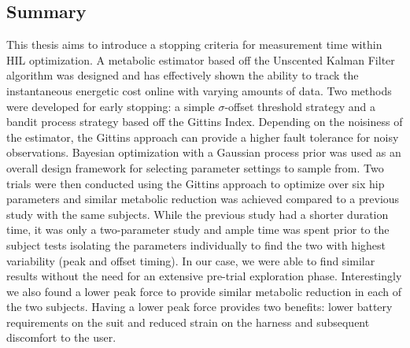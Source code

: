 \subsection*{Summary}
This thesis aims to introduce a stopping criteria for measurement time within HIL optimization. A metabolic estimator based off the Unscented Kalman Filter algorithm was designed and has effectively shown the ability to track the instantaneous energetic cost online with varying amounts of data. Two methods were developed for early stopping: a simple $\sigma$-offset threshold strategy and a bandit process strategy based off the Gittins Index. Depending on the noisiness of the estimator, the Gittins approach can provide a higher fault tolerance for noisy observations. Bayesian optimization with a Gaussian process prior was used as an overall design framework for selecting parameter settings to sample from. Two trials were then conducted using the Gittins approach to optimize over six hip parameters and similar metabolic reduction was achieved compared to a previous study with the same subjects. While the previous study had a shorter duration time, it was only a two-parameter study and ample time was spent prior to the subject tests isolating the parameters individually to find the two with highest variability (peak and offset timing). In our case, we were able to find similar results without the need for an extensive pre-trial exploration phase. Interestingly we also found a lower peak force to provide similar metabolic reduction in each of the two subjects. Having a lower peak force provides two benefits: lower battery requirements on the suit and reduced strain on the harness and subsequent discomfort to the user.

